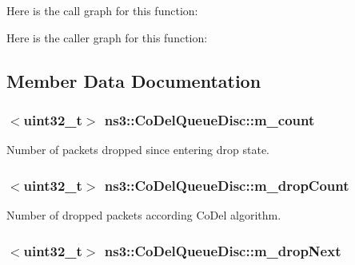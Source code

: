 Here is the call graph for this function\+:




Here is the caller graph for this function\+:




\subsection{Member Data Documentation}
\subsubsection[{\texorpdfstring{m\+\_\+count}{m_count}}]{$<$uint32\+\_\+t$>$ ns3\+::\+Co\+Del\+Queue\+Disc\+::m\+\_\+count\hspace{0.3cm}{\ttfamily [private]}}\hypertarget{classns3_1_1CoDelQueueDisc_a87a17c1b3df276df0a43a4270ee6515c}{}\label{classns3_1_1CoDelQueueDisc_a87a17c1b3df276df0a43a4270ee6515c}


Number of packets dropped since entering drop state. 

\subsubsection[{\texorpdfstring{m\+\_\+drop\+Count}{m_dropCount}}]{$<$uint32\+\_\+t$>$ ns3\+::\+Co\+Del\+Queue\+Disc\+::m\+\_\+drop\+Count\hspace{0.3cm}{\ttfamily [private]}}\hypertarget{classns3_1_1CoDelQueueDisc_ae61e9b4326d0f0b7db697c1e44e1336f}{}\label{classns3_1_1CoDelQueueDisc_ae61e9b4326d0f0b7db697c1e44e1336f}


Number of dropped packets according Co\+Del algorithm. 

\subsubsection[{\texorpdfstring{m\+\_\+drop\+Next}{m_dropNext}}]{$<$uint32\+\_\+t$>$ ns3\+::\+Co\+Del\+Queue\+Disc\+::m\+\_\+drop\+Next\hspace{0.3cm}{\ttfamily [private]}}\hypertarget{classns3_1_1CoDelQueueDisc_afb812be3b2ea5064053bdc884144965d}{}\label{classns3_1_1CoDelQueueDisc_afb812be3b2ea5064053bdc884144965d}


